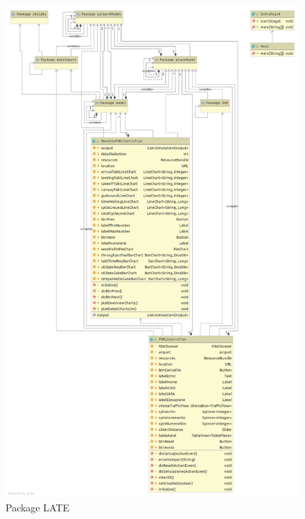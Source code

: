 \documentclass[a4paper, 12pt]{article}
\begin{document}
\begin{figure}[H]
\caption{Package LATE}
 \label{fig:lateristretto}
\hfill \includegraphics[height=\textheight]{resources/images/UML/Package LATE_RISTRETTO.png} \hspace*{\fill}
\end{figure}
\end{document}
